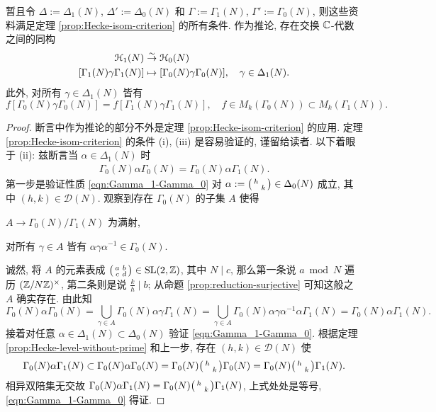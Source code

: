 \begin{theorem}\label{prop:Gamma_1-Gamma_0}
	暂且令 $\Delta := \Delta_1(N)$, $\Delta' := \Delta_0(N)$ 和 $\Gamma := \Gamma_1(N)$, $\Gamma' := \Gamma_0(N)$, 则这些资料满足定理 \ref{prop:Hecke-isom-criterion} 的所有条件. 作为推论, 存在交换 $\mathbb{C}$-代数之间的同构
	\begin{align*}
		\EuScript{H}_1(N) & \stackrel{\sim}{\rightarrow} \EuScript{H}_0(N) \\
		[\Gamma_1(N) \gamma \Gamma_1(N)] & \mapsto [\Gamma_0(N) \gamma \Gamma_0(N)], \quad \gamma \in \Delta_1(N).
	\end{align*}
	此外, 对所有 $\gamma \in \Delta_1(N)$ 皆有
	\[ f[\Gamma_0(N) \gamma \Gamma_0(N)] = f[\Gamma_1(N)\gamma \Gamma_1(N)], \quad f \in M_k(\Gamma_0(N)) \subset M_k(\Gamma_1(N)). \]
\end{theorem}
\begin{proof}
	断言中作为推论的部分不外是定理 \ref{prop:Hecke-isom-criterion} 的应用. 定理 \ref{prop:Hecke-isom-criterion} 的条件 (i), (iii) 是容易验证的, 谨留给读者. 以下着眼于 (ii): 兹断言当 $\alpha \in \Delta_1(N)$ 时
	\begin{gather}\label{eqn:Gamma_1-Gamma_0}
		\Gamma_0(N) \alpha \Gamma_0(N) = \Gamma_0(N) \alpha \Gamma_1(N).
	\end{gather}
	第一步是验证性质 \eqref{eqn:Gamma_1-Gamma_0} 对 $\alpha := \bigl(\begin{smallmatrix} h &  \\  & k \end{smallmatrix}\bigr) \in \Delta_0(N)$ 成立, 其中 $(h,k) \in \mathcal{D}(N)$. 观察到存在 $\Gamma_0(N)$ 的子集 $A$ 使得
	\begin{compactitem}
		\item $A \to \Gamma_0(N)/\Gamma_1(N)$ 为满射,
		\item 对所有 $\gamma \in A$ 皆有 $\alpha\gamma\alpha^{-1} \in \Gamma_0(N)$.
	\end{compactitem}
	诚然, 将 $A$ 的元素表成 $\bigl(\begin{smallmatrix} a & b \\ c & d \end{smallmatrix}\bigr) \in \operatorname{SL}(2,\mathbb{Z})$, 其中 $N \mid c$, 那么第一条说 $a \bmod N$ 遍历 $(\mathbb{Z}/N\mathbb{Z})^\times$, 第二条则是说 $\frac{k}{h} \mid b$; 从命题 \ref{prop:reduction-surjective} 可知这般之 $A$ 确实存在. 由此知
	\begin{equation*}
		\Gamma_0(N) \alpha \Gamma_0(N) = \bigcup_{\gamma \in A} \Gamma_0(N) \alpha\gamma \Gamma_1(N) = \bigcup_{\gamma \in A} \Gamma_0(N) \alpha\gamma\alpha^{-1} \alpha \Gamma_1(N) = \Gamma_0(N) \alpha \Gamma_1(N).
	\end{equation*}
	接着对任意 $\alpha \in \Delta_1(N) \subset \Delta_0(N)$ 验证 \eqref{eqn:Gamma_1-Gamma_0}. 根据定理 \ref{prop:Hecke-level-without-prime} 和上一步, 存在 $(h,k) \in \mathcal{D}(N)$ 使
	\[ \Gamma_0(N) \alpha \Gamma_1(N) \subset \Gamma_0(N) \alpha \Gamma_0(N) = \Gamma_0(N) \bigl(\begin{smallmatrix} h &  \\  & k \end{smallmatrix}\bigr) \Gamma_0(N) = \Gamma_0(N) \bigl(\begin{smallmatrix} h &  \\  & k \end{smallmatrix}\bigr) \Gamma_1(N). \]
	相异双陪集无交故 $\Gamma_0(N) \alpha \Gamma_1(N) = \Gamma_0(N) \bigl(\begin{smallmatrix} h &  \\  & k \end{smallmatrix}\bigr) \Gamma_1(N)$, 上式处处是等号, \eqref{eqn:Gamma_1-Gamma_0} 得证.
\end{proof}

